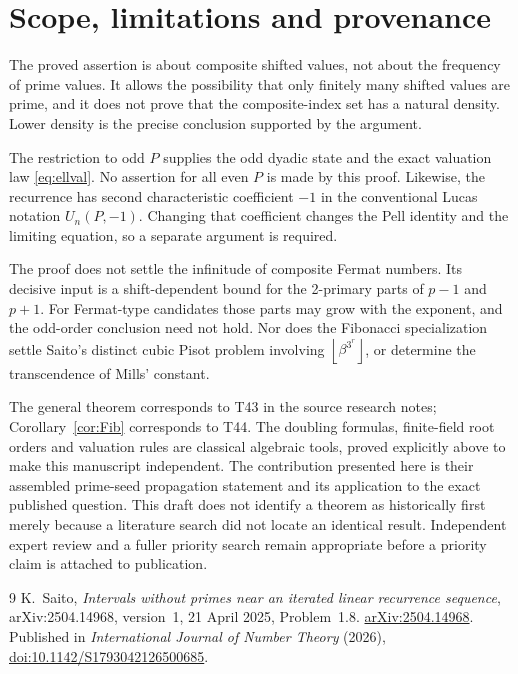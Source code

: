 \documentclass[11pt,a4paper]{article}
\theoremstyle{definition}\newtheorem{definition}[theorem]{Definition}
\theoremstyle{remark}\newtheorem{remark}[theorem]{Remark}
\newcommand{\floor}[1]{\left\lfloor #1\right\rfloor}\newcommand{\ceil}[1]{\left\lceil #1\right\rceil}
\begin{document}
\section{Scope, limitations and provenance}
The proved assertion is about composite shifted values, not about the
frequency of prime values. It allows the possibility that only
finitely many shifted values are prime, and it does not prove that
the composite-index set has a natural density. Lower density is the
precise conclusion supported by the argument.

The restriction to odd $P$ supplies the odd dyadic state and the exact
valuation law \eqref{eq:ellval}. No assertion for all even $P$ is made
by this proof. Likewise, the recurrence has second characteristic
coefficient $-1$ in the conventional Lucas notation $U_n(P,-1)$.
Changing that coefficient changes the Pell identity and the limiting
equation, so a separate argument is required.

The proof does not settle the infinitude of composite Fermat numbers.
Its decisive input is a shift-dependent bound for the 2-primary
parts of $p-1$ and $p+1$. For Fermat-type candidates those parts may
grow with the exponent, and the odd-order conclusion need not hold.
Nor does the Fibonacci specialization settle Saito's distinct cubic
Pisot problem involving $\floor{\beta^{3^r}}$, or determine the
transcendence of Mills' constant.

The general theorem corresponds to T43 in the source research notes;
Corollary~\ref{cor:Fib} corresponds to T44. The doubling formulas,
finite-field root orders and valuation rules are classical algebraic
tools, proved explicitly above to make this manuscript independent.
The contribution presented here is their assembled prime-seed
propagation statement and its application to the exact published
question. This draft does not identify a theorem as historically first
merely because a literature search did not locate an identical result.
Independent expert review and a fuller priority search remain
appropriate before a priority claim is attached to publication.

\begin{thebibliography}{9}
K.~Saito,
\emph{Intervals without primes near an iterated linear recurrence
sequence}, arXiv:2504.14968, version~1, 21 April 2025,
Problem~1.8.
\href{https://arxiv.org/abs/2504.14968}{arXiv:2504.14968}.
Published in \emph{International Journal of Number Theory} (2026),
\href{https://doi.org/10.1142/S1793042126500685}
{doi:10.1142/S1793042126500685}.
\end{thebibliography}
\end{document}
